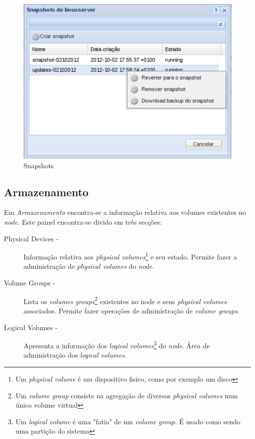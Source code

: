 \begin{figure}[H]
	\begin{center}
	\includegraphics[scale=0.5]{screenshots/server_snapshots.png}
	\caption{Snapshots}
	\label{fig:server_snapshots}
	\end{center}
\end{figure}

\subsection{Armazenamento}
\label{sec:storage}

Em \emph{Armazenamento} encontra-se a informação relativa aos volumes existentes no \emph{node}.
Este painel encontra-se divido em três secções:

\begin{description}
	\item[Physical Devices -] Informação relativa aos \emph{physical volumes}\footnote{Um \emph{physical volume} é um dispositivo fisico, como por exemplo um disco} e seu estado. Permite fazer a administração de \emph{physical volumes} do \emph{node}.
	\item[Volume Groups -] Lista os \emph{volumes groups}\footnote{Um \emph{volume group} consiste na agregação de diversos \emph{physical volumes} num único volume virtual} existentes no node e seus \emph{physical volumes} associados. Permite fazer operações de administração de \emph{volume groups}.
	\item[Logical Volumes -] Apresenta a informação dos \emph{logical volumes}\footnote{Um \emph{logical volume} é uma "fatia" de um \emph{volume group}. É usado como sendo uma partição do sistema} do \emph{node}. Área de administração dos \emph{logical volumes}.
\end{description}


